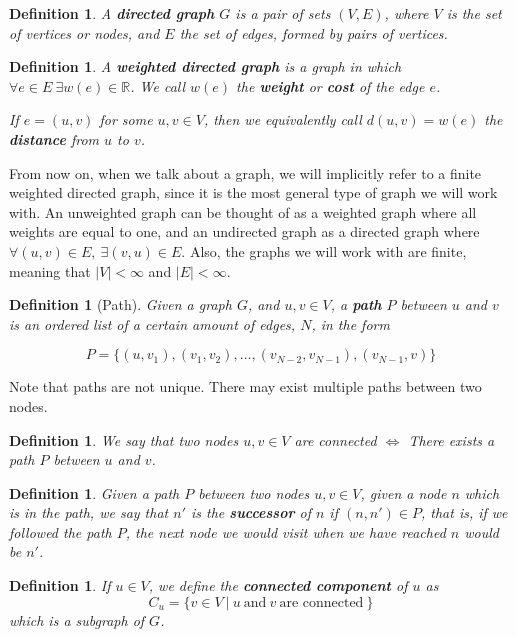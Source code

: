 \documentclass[a4paper,10pt]{report}
\newtheorem{definition}[theorem]{Definition}
\begin{document}
\begin{definition}
A \textbf{directed graph} $G$ is a pair of sets $(V, E)$, where $V$ is the set of vertices or nodes, and $E$ the set of edges, formed by pairs of vertices.
\end{definition}

\begin{definition}
A \textbf{weighted directed graph} is a graph in which $\forall e \in E \ \exists w(e) \in \mathbb{R}$. We call $w(e)$ the \textbf{weight} or \textbf{cost} of the edge $e$.

If $e = (u, v)$ for some $u, v \in V$, then we equivalently call $d(u, v) = w(e)$ the \textbf{distance} from $u$ to $v$.
\end{definition}

From now on, when we talk about a graph, we will implicitly refer to a finite weighted directed graph, since it is the most general type of graph we will work with. An unweighted graph can be thought of as a weighted graph where all weights are equal to one, and an undirected graph as a directed graph where $\forall (u, v) \in E,\  \exists (v, u) \in E$. Also, the graphs we will work with are finite, meaning that $|V| < \infty$ and $|E| < \infty$.

\begin{definition}[Path]
Given a graph $G$, and $u, v \in V$, a \textbf{path} $P$ between $u$ and $v$ is an ordered list of a certain amount of edges, $N$, in the form

\[ P = \{(u,v_1), (v_1, v_2), \dots, (v_{N-2}, v_{N-1}), (v_{N-1}, v)\} \]
\end{definition}

Note that paths are not unique. There may exist multiple paths between two nodes.

\begin{definition}
We say that two nodes $u, v \in V$ are connected $\Longleftrightarrow$ There exists a path $P$ between $u$ and $v$.
\end{definition}

\begin{definition}
Given a path $P$ between two nodes $u, v \in V$, given a node $n$ which is in the path, we say that $n'$ is the \textbf{successor} of $n$ if $(n, n') \in P$, that is, if we followed the path $P$, the next node we would visit when we have reached $n$ would be $n'$.
\end{definition}

\begin{definition}
If $u \in V$, we define the \textbf{connected component} of $u$ as
\[ C_u = \{ v \in V\ |\ u \ \text{and} \ v \ \text{are connected}\  \} \]
which is a subgraph of $G$.
\end{definition}
\end{document}
